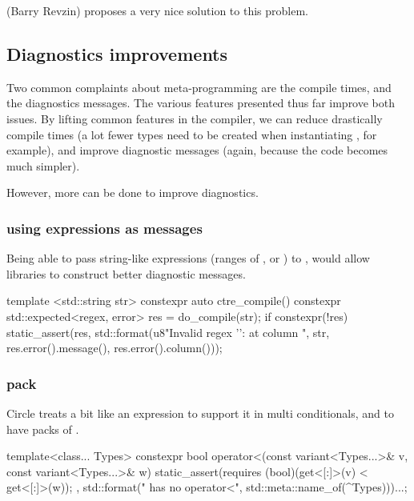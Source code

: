 \documentclass{wg21}
\begin{document}
 (Barry Revzin) proposes a very nice solution to this problem.

\subsection{Diagnostics improvements}

Two common complaints about meta-programming are the compile times,
and the diagnostics messages.
The various features presented thus far improve both issues. By lifting common features in the compiler,
we can reduce drastically compile times (a lot fewer types need to be created when instantiating , for example), and improve diagnostic messages (again, because the code becomes much simpler).

However, more can be done to improve diagnostics.

\subsubsection{ using expressions as messages}
\label{sec:static_assert_expr}

Being able to pass string-like expressions (ranges of , or ) to ,
would allow libraries to construct better diagnostic messages.

\begin{colorblock}
template <std::string str>
constexpr auto ctre_compile() {
   constexpr std::expected<regex, error> res = do_compile(str);
   if constexpr(!res) {
       static_assert(res, std::format(u8"Invalid regex '{}': {} at column {}",
                                      str, res.error().message(), res.error().column()));
   }
}
\end{colorblock}

\subsubsection{ pack}
\label{sec:static_assert_pack}

Circle treats  a bit like an expression to support it in multi conditionals, and to have packs of .

\begin{colorblock}
template<class... Types>
constexpr bool operator<(const variant<Types...>& v,  const variant<Types...>& w) {
    static_assert(requires{ (bool)(get<[:]>(v) < get<[:]>(w)); },
        std::format("{} has no operator<", std::meta::name_of(^Types)))...;
}
\end{colorblock}
\end{document}
